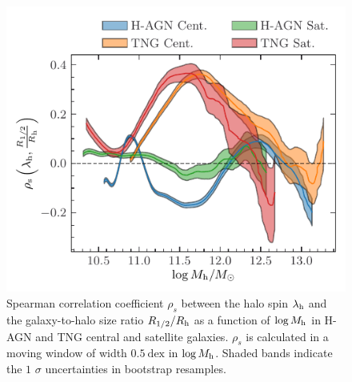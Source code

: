 \documentclass[usenatbib,useAMS]{mnras}
\begin{document}
\begin{figure}
    \centering
    \includegraphics[width=\columnwidth]{Figures/spin_size_spearmans.pdf}
    \caption{Spearman correlation coefficient $\rho_s$ between the halo spin $\lambda_{\rm h}$ and the galaxy-to-halo size ratio $R_{1/2}/R_{\rm h}$ as a function of $\log M_{\rm h}$ in H-AGN and TNG central and satellite galaxies. $\rho_s$ is calculated in a moving window of width $0.5~\mathrm{dex}$ in $\log M_{\rm h}$. Shaded bands indicate the $1$ $\sigma$ uncertainties in bootstrap resamples.}
    \label{fig:mvir_spearms}
\end{figure}
\end{document}
